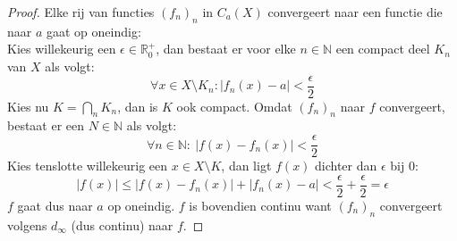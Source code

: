 \documentclass[main.tex]{subfiles}
\begin{document}
\begin{st}
\begin{proof}
      Elke rij van functies $(f_{n})_{n}$ in $C_{a}(X)$ convergeert naar een functie die naar $a$ gaat op oneindig:\\
      Kies willekeurig een $\epsilon\in\mathbb{R}_{0}^{+}$, dan bestaat er voor elke $n\in\mathbb{N}$ een compact deel $K_{n}$ van $X$ als volgt:
      \[ \forall x\in X \setminus K_{n}: |f_{n}(x)-a| < \frac{\epsilon}{2} \]
      Kies nu $K = \bigcap_{n}K_{n}$, dan is $K$ ook compact.
      Omdat $(f_{n})_{n}$ naar $f$ convergeert, bestaat er een $N\in\mathbb{N}$ als volgt:
      \[ \forall n\in\mathbb{N}:\ |f(x)-f_{n}(x)| < \frac{\epsilon}{2} \]
      Kies tenslotte willekeurig een $x\in X\setminus K$, dan ligt $f(x)$ dichter dan $\epsilon$ bij $0$:
      \[ |f(x)| \le |f(x) - f_{n}(x)| + |f_{n}(x)-a| < \frac{\epsilon}{2} + \frac{\epsilon}{2} = \epsilon \]
      $f$ gaat dus naar $a$ op oneindig.
      $f$ is bovendien continu want $(f_{n})_{n}$ convergeert volgens $d_{\infty}$ (dus continu) naar $f$.
  \end{proof}
\end{st}
\end{document}
